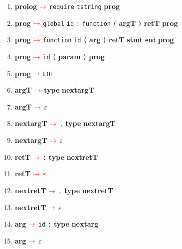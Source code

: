 \documentclass{article}
\def\nonterm #1{\boldmath{$<$}\textbf{#1}\boldmath{$>$}\space}
\def\term #1{\texttt{#1}\space}
\newcommand{\arrow} {$\color{red} \rightarrow$\space}
\newcommand{\unsc} {\underline{\hspace{0.2cm}}}
\begin{document}
    \begin{enumerate}[label=\textcolor{red}{\arabic*.}]
        \item \nonterm{prolog} \arrow{} \term{require} \term{t\unsc{}string} \nonterm{prog}
        
        \item \nonterm{prog} \arrow{} \term{global} \term{id} \term{:} \term{function} \term{(} \nonterm{arg\unsc{}T} \term{)} \nonterm{ret\unsc{}T} \nonterm{prog}
        
        \item \nonterm{prog} \arrow{} \term{function} \term{id} \term{(} \nonterm{arg} \term{)} \nonterm{ret\unsc{}T} \nonterm{stmt} \term{end} \nonterm{prog}
        
        \item \nonterm{prog} \arrow{} \term{id} \term{(} \nonterm{param} \term{)} \nonterm{prog}
        \item \nonterm{prog} \arrow{} \term{EOF}
                
        \item \nonterm{arg\unsc{}T} \arrow{} \nonterm{type} \nonterm{next\unsc{}arg\unsc{}T}
        \item \nonterm{arg\unsc{}T} \arrow{} \term{$\varepsilon$}
                
        \item \nonterm{next\unsc{}arg\unsc{}T} \arrow{} \term{,} \nonterm{type} \nonterm{next\unsc{}arg\unsc{}T}
        
        \item \nonterm{next\unsc{}arg\unsc{}T} \arrow{} \term{$\varepsilon$}
                
        \item \nonterm{ret\unsc{}T} \arrow{} \term{:} \nonterm{type} \nonterm{next\unsc{}ret\unsc{}T}
        
        \item \nonterm{ret\unsc{}T} \arrow{} \term{$\varepsilon$}
        
        \item \nonterm{next\unsc{}ret\unsc{}T} \arrow{} \term{,} \nonterm{type} \nonterm{next\unsc{}ret\unsc{}T}
        
        \item \nonterm{next\unsc{}ret\unsc{}T} \arrow{} \term{$\varepsilon$}
               
        \item \nonterm{arg} \arrow{} \term{id} \term{:} \nonterm{type} \nonterm{next\unsc{}arg}
        \item \nonterm{arg} \arrow{} \term{$\varepsilon$}
        

\end{enumerate}
\end{document}
